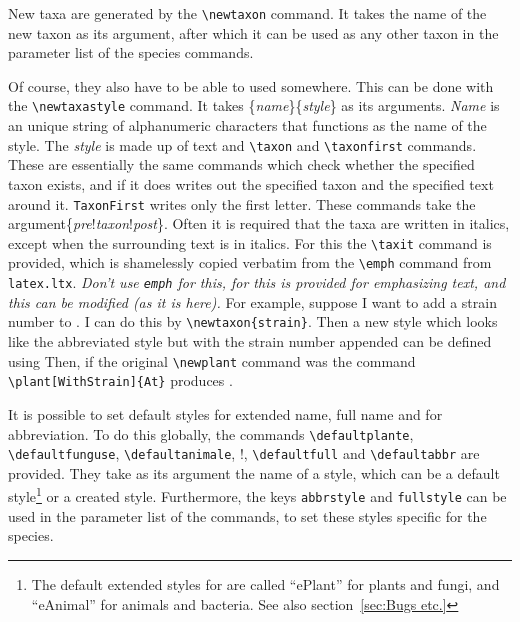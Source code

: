 \documentclass{article}
\makeatletter
\newenvironment{breakverbatim}{\def\@xobeysp{\ }\verbatim}{\endverbatim}
\makeatother
\begin{document}
New taxa are generated by the \verb!\newtaxon! command. It takes the name of the new taxon as its argument, after which it can be used as any other taxon in the parameter list of the species commands.

Of course, they also have to be able to used somewhere. This can be done with the \verb!\newtaxastyle! command. It takes \{\textit{name}\}\{\textit{style}\} as its arguments. \textit{Name} is an unique string of alphanumeric characters that functions as the name of the style. The \textit{style} is made up of text and \verb!\taxon! and \verb!\taxonfirst! commands. These are essentially the same commands which check whether the specified taxon exists, and if it does writes out the specified taxon and the specified text around it. \verb!TaxonFirst! writes only the first letter. These commands take the argument\{\textit{pre}!\textit{taxon}!\textit{post}\}. Often it is required that the taxa are written in italics, except when the surrounding text is in italics. For this the \verb!\taxit! command is provided, which is shamelessly copied verbatim from the \verb!\emph! command from \texttt{latex.ltx}. \emph{Don't use \texttt{emph} for this, for this is provided for emphasizing text, and this can be modified (as it is here).} For example, suppose I want to add a strain number to . I can do this by \verb!\newtaxon{strain}!. Then a new style which looks like the abbreviated style but with the strain number appended can be defined using \begin{breakverbatim}\end{breakverbatim}
Then, if the original \verb!\newplant! command was \begin{breakverbatim}\end{breakverbatim} 
the command \verb!\plant[WithStrain]{At}! produces .

It is possible to set default styles for extended name, full name and for abbreviation. To do this globally, the commands \verb!\defaultplante!, \verb!\defaultfunguse!, \verb!\defaultanimale!, !, \verb!\defaultfull! and \verb!\defaultabbr! are provided. They take as its argument the name of a style, which  can be a default style\footnote{The default extended styles for are called ``ePlant'' for plants and fungi, and ``eAnimal'' for animals and bacteria. See also section~\ref{sec:Bugs etc.}} or a created style. Furthermore, the keys \verb!abbrstyle! and \verb!fullstyle! can be used in the parameter list of the commands, to set these styles specific for the species.
\end{document}
